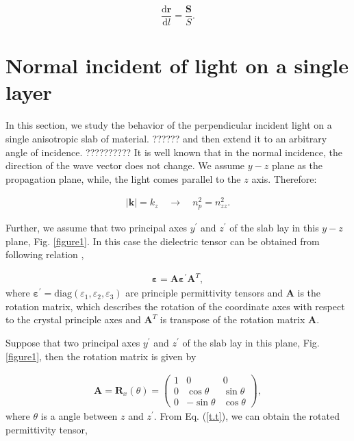 \documentclass[9pt,twocolumn,twoside]{osajnl}
\begin{document}
\begin{equation}\label{p.v}
\dfrac{\mathbf{\mathrm{d}{r}}}{\mathrm{d}{l}}=\dfrac{\mathbf{S}}{S}.
\end{equation}


\section{Normal incident of light on a single layer} \label{general-normal}

In this section, we study the behavior of the perpendicular incident light on a single anisotropic slab of material.
?????? and then extend it to an arbitrary angle of incidence.
??????????
It is well known that in the normal incidence, the direction of the wave vector does not change.  We assume $y-z$ plane as the propagation plane, while, the light comes parallel to the $z$ axis. Therefore:  

\begin{eqnarray}\label{pt}
|\mathbf{k}|=k_{z} \quad\rightarrow \quad {n}^{2}_{p}=n^{2}_{zz}.
\end{eqnarray} 

Further, we assume that  two principal axes  $y^{\prime}$ and $z^{\prime}$ of the slab lay in this $y-z$ plane, Fig. \ref{figure1}.
In this case the dielectric tensor can be obtained from following relation \cite{yeh1980optics},

 \begin{eqnarray}\label{t.t}
		\boldsymbol{\varepsilon}= \mathbf{A} \boldsymbol{\varepsilon^{\prime}}\mathbf{A}^{T},
\end{eqnarray}
where $ \boldsymbol{\varepsilon^{\prime}} = \mbox{diag} (\varepsilon_{1},\varepsilon_{2},\varepsilon_{3})$ are  principle permittivity tensors and $\mathbf{A}$  is the rotation matrix, which describes the rotation of the coordinate axes with respect to the crystal principle axes and $ \mathbf{A}^{T}$ is transpose of the rotation matrix $ \mathbf{A}$.

Suppose that two principal axes  $y^{\prime}$ and $z^{\prime}$ of the slab lay in this plane, Fig. \ref{figure1}, then the rotation matrix is given by
 
\begin{align}\label{r.m}
        \mathbf{A}=\mathbf{R}_{x}(\theta)=
        \begin{pmatrix}
            1&0&0 \\
            0&\cos{\theta} &\sin{\theta} \\
            0&-\sin{\theta} & \cos{\theta}
        \end{pmatrix},
\end{align}
where $\theta$ is a angle between $z$ and $z^{\prime}$.  From Eq. (\ref{t.t}),  we can obtain the rotated permittivity tensor,
\end{document}
